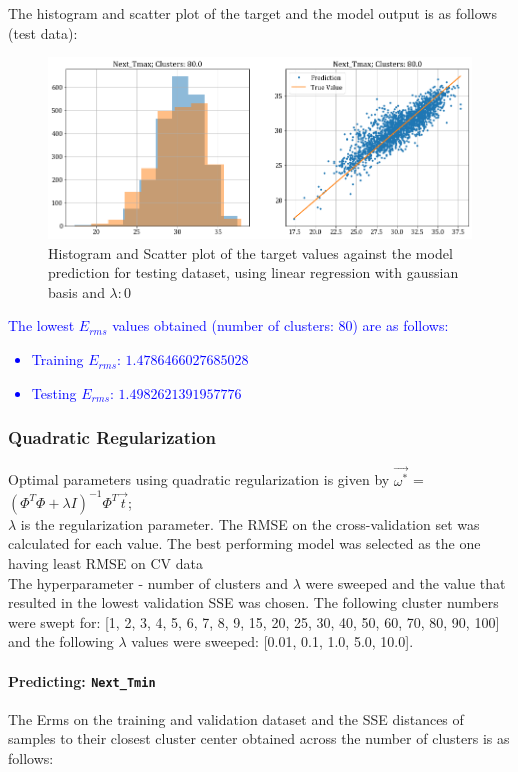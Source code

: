 \documentclass[12pt,a4paper]{article}
\newcommand{\noi}{\noindent}
\def\tt#1{\texttt{#1}}
\begin{document}
\noi
The histogram and scatter plot of the target and the model output is as follows (test data):
\begin{figure}[H]
    \centering
    \includegraphics[scale=0.49]{images/t3_d3/no_reg/T_max_test.png}
    \caption{Histogram and Scatter plot of the target values against the model prediction for testing dataset, using linear regression with gaussian basis and $\lambda: 0$}
\end{figure}

\noi
\textcolor{blue}{The lowest $E_{rms}$ values obtained (number of clusters: 80) are as follows:
\begin{itemize}
    \itemsep0em
    \item Training $E_{rms}$: $1.4786466027685028$
    \item Testing $E_{rms}$: $1.4982621391957776$
\end{itemize}
}

\subsubsection{Quadratic Regularization}
Optimal parameters using quadratic regularization is given by $\vec{\omega^*}$ = $(\Phi^T\Phi + \lambda I)^{-1} \Phi^T \vec{t}$;\\

\noi
$\lambda$ is the regularization parameter. The RMSE on the cross-validation set was calculated for each value. The best performing model was selected as the one having least RMSE on CV data \\

\noi
The hyperparameter - number of clusters and $\lambda$ were sweeped and the value that resulted in the lowest validation SSE was chosen. The following cluster numbers were swept for: [1, 2, 3, 4, 5, 6, 7, 8, 9, 15, 20, 25, 30, 40, 50, 60, 70, 80, 90, 100] and the following $\lambda$ values were sweeped: [0.01, 0.1,  1.0, 5.0, 10.0].

\paragraph{Predicting: \tt{Next\_Tmin}}
The Erms on the training and validation dataset and the SSE distances of samples to their closest cluster center obtained across the number of clusters is as follows:

\end{document}
